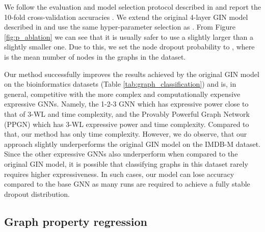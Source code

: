 \documentclass{article}
\begin{document}
We follow the evaluation and model selection protocol described in \citep{GIN} and report the 10-fold cross-validation accuracies \citep{yanardag2015deep}. We extend the original 4-layer GIN model described in \citep{GIN} and use the same hyper-parameter selection as \citep{GIN}. 
From Figure \ref{fig:p_ablation} we can see that it is usually safer to use a slightly larger  than a slightly smaller one. Due to this, we set the node dropout probability to , where  is the mean number of nodes in the graphs in the dataset.

Our method successfully improves the results achieved by the original GIN model on the bioinformatics datasets (Table \ref{tab:graph_classification}) and is, in general, competitive with the more complex and computationally expensive expressive GNNs. Namely, the 1-2-3 GNN \citep{morris2019weisfeiler} which has expressive power close to that of 3-WL and  time complexity, and the Provably Powerful Graph Network (PPGN) \citep{maron2019provably} which has 3-WL expressive power and  time complexity. Compared to that, our method has only  time complexity.
However, we do observe, that our approach slightly underperforms the original GIN model on the IMDB-M dataset.
Since the other expressive GNNs also underperform when compared to the original GIN model, it is possible that classifying graphs in this dataset rarely requires higher expressiveness. In such cases, our model can lose accuracy compared to the base GNN as many runs are required to achieve a fully stable dropout distribution. 

\subsection{Graph property regression}
\end{document}
